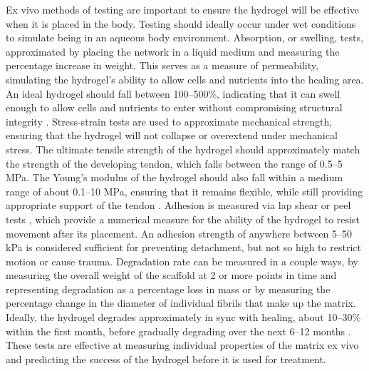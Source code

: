 Ex vivo methods of testing are important to ensure the hydrogel will be effective when it is
placed in the body. Testing should ideally occur under wet conditions to simulate being in an
aqueous body environment. Absorption, or swelling, tests, approximated by placing the network
in a liquid medium and measuring the percentage increase in weight. This serves as a measure
of permeability, simulating the hydrogel's ability to allow cells and nutrients into the healing area.
An ideal hydrogel should fall between 100--500\%, indicating that it can swell enough to allow
cells and nutrients to enter without compromising structural integrity \autocite{zhangProtocolEfficientlyMeasuring2020}. Stress-strain
tests are used to approximate mechanical strength, ensuring that the hydrogel will not collapse
or overextend under mechanical stress. The ultimate tensile strength of the hydrogel should
approximately match the strength of the developing tendon, which falls between the range of
0.5--5 MPa. The Young's modulus of the hydrogel should also fall within a medium range of
about 0.1--10 MPa, ensuring that it remains flexible, while still providing appropriate support of
the tendon \autocite{xiaoMechanicalTestingHydrogels2013}. Adhesion is measured via lap shear or peel tests \autocite{ChenAdvancesApplicationHydrogel}, which
provide a numerical measure for the ability of the hydrogel to resist movement after its
placement. An adhesion strength of anywhere between 5--50 kPa is considered sufficient for
preventing detachment, but not so high to restrict motion or cause trauma. Degradation rate can
be measured in a couple ways, by measuring the overall weight of the scaffold at 2 or more
points in time and representing degradation as a percentage loss in mass or by measuring the
percentage change in the diameter of individual fibrils that make up the matrix. Ideally, the
hydrogel degrades approximately in sync with healing, about 10--30\% within the first month,
before gradually degrading over the next 6--12 months \autocite{zhuTailoringDegradationRates2015}. These tests are effective at
measuring individual properties of the matrix ex vivo and predicting the success of the hydrogel
before it is used for treatment.